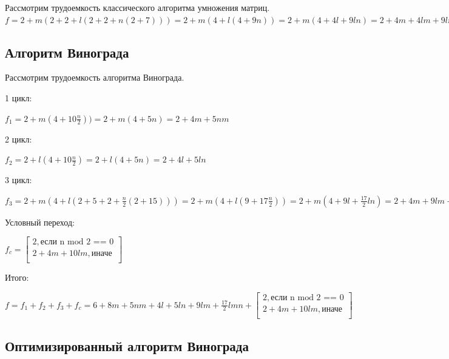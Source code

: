 \documentclass[a4paper,14pt]{report}
\begin{document}
Рассмотрим трудоемкость классического алгоритма умножения матриц.\\

$f = 2 + m(2 + 2 + l(2 + 2 + n(2 + 7))) = 2 + m(4 + l(4 + 9n)) = 2 + m(4 + 4l + 9ln) = 2 + 4m + 4lm + 9lmn$ \\

\subsection*{Алгоритм Винограда}

Рассмотрим трудоемкость алгоритма Винограда.





1 цикл:

$f_{1} = 2 + m(4 + 10 \frac{n}{2})) = 2 + m(4 + 5n) = 2 + 4m + 5nm$

2 цикл:

$f_{2} = 2 + l(4 + 10\frac{n}{2}) = 2 + l(4 + 5n) = 2 + 4l + 5ln$

3 цикл:

$f_{3} = 2 + m(4 + l(2 + 5 + 2 + \frac{n}{2}(2 + 15))) = 2 + m(4 + l(9 + 17\frac{n}{2})) = 2 + m(4 + 9l + \frac{17}{2}ln) = 2 + 4m + 9lm + \frac{17}{2}lmn$

Условный переход:

$f_{c} = \begin{bmatrix}
2, \text{если n mod 2 == 0} \\
2 + 4m + 10lm, \text{иначе} \\
\end{bmatrix}$

Итого:

$f = f_{1} + f_{2} + f_{3} + f_{c} = 6 + 8m + 5nm + 4l + 5ln + 9lm + \frac{17}{2}lmn + \begin{bmatrix}
2, \text{если n mod 2 == 0} \\
2 + 4m + 10lm, \text{иначе} \\
\end{bmatrix}$

\subsection*{Оптимизированный алгоритм Винограда}
\end{document}
